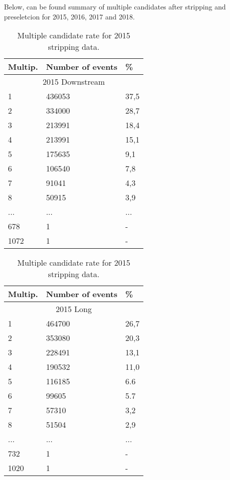 
\newpage
\newpage

Below, can be found summary of multiple candidates after stripping and preseletcion for 2015, 2016, 2017 and 2018.

\begin{table}[h!]
\begin{center}
\begin{tabular}{ p{2.6cm}p{3.1cm}p{0.6cm} }
\hline
\hline
Multip.  & Number of events & \% \\
\hline
    \multicolumn{3}{c}{2015 Downstream}\\
\hline
     1    & 436053 & 37,5 \\
     2    & 334000 & 28,7\\
     3    & 213991 & 18,4 \\
     4    & 213991 & 15,1 \\
     5    & 175635 & 9,1 \\
     6    & 106540 & 7,8 \\
     7    & 91041  & 4,3 \\
     8    & 50915  & 3,9 \\
    ...   &   ...  &  ... \\
    678   &    1 & -   \\
    1072  &    1 & -    \\
     
\hline
\end{tabular}
\quad
\begin{tabular}{ p{2.6cm}p{3.1cm}p{0.6cm} }
\hline
\hline
Multip.  & Number of events & \% \\
\hline
    \multicolumn{3}{c}{2015 Long}\\
\hline
     1    & 464700 & 26,7 \\
     2    & 353080 & 20,3\\
     3    & 228491 & 13,1 \\
     4    & 190532 & 11,0 \\
     5    & 116185 & 6.6 \\
     6    & 99605 & 5.7 \\
     7    & 57310  & 3,2\\
     8    & 51504 & 2,9\\
    ...   &   ...  &  ... \\
    732   &    1 & -   \\
    1020  &    1 & -    \\
     
\hline
\end{tabular}
\caption{Multiple candidate rate for 2015 stripping data.}
\label{tab:multi2015raw}
\end{center}
\end{table}%

